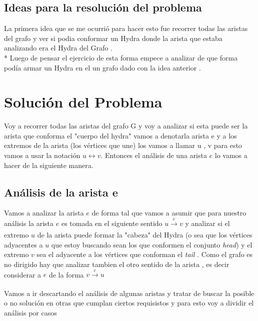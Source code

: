 \documentclass[12pt]{article}
\begin{document}
     

    \subsection*{Ideas para la resoluci\'on del problema }
    
    \noindent La primera idea que se me ocurri\'o para hacer esto fue recorrer todas 
    las aristas del grafo y ver si podia conformar un Hydra donde la arista que estaba 
    analizando era el Hydra del Grafo .
    \\*
    Luego de pensar el ejercicio de esta forma empece a analizar de que forma pod\'ia armar un Hydra 
    en el un grafo dado con la idea anterior  .

    \section{Soluci\'on del Problema }

    \noindent Voy a recorrer todas las aristas del grafo G y voy a analizar si 
    esta puede ser la arista que conforma el "cuerpo del hydra"  vamos a 
    denotarla arista e y a los extremos de la arista (los v\'ertices que une) 
    los vamos a llamar u , v para esto vamos a usar la notaci\'on  $u \leftrightarrow v$.
    Entonces el an\'alisis de una arista $e$ lo vamos  a hacer de la siguiente manera. 
    

    \subsection{An\'alisis de la arista e}

    \noindent Vamos a analizar la arista $e$ de forma tal que vamos a asumir que para nuestro an\'alisis la arista $e$ 
    es tomada en el siguiente sentido $u\xrightarrow[]{e}v$ y analizar si el extremo $u$ de la arista puede formar 
    la "cabeza" del Hydra (o sea que los v\'ertices adyacentes a $u$ que estoy buscando sean los que conformen el conjunto 
    \textit{head}) y el extremo $v$ sea el adyacente a los v\'ertices que conforman el \textit{tail} . Como el grafo es no 
    dirigido hay que analizar tambien el otro sentido de la arista , es decir considerar a $e$ de la forma $v\xrightarrow[]{e}u$ 

    \noindent Vamos a ir descartando el an\'alisis de algunas aristas y tratar de buscar la posible o no soluci\'on
    en otras que cumplan ciertos requisistos y para esto  voy a dividir el an\'alisis por casos
\end{document}
